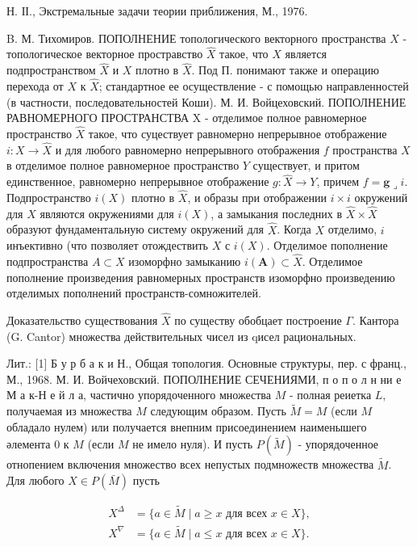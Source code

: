 \documentclass[10pt]{article}
\begin{document}
Н. ІІ., Экстремальные задачи теории приближения, М., 1976.



B. М. Тихомиров. ПОПОЛНЕНИЕ топологического векторного пространства $X$ - топологическое векторное простравство $\hat{X}$ такое, что $X$ является подпространством $\hat{X}$ и $X$ плотно в $\hat{X}$. Под П. понимают также и операцию перехода от $X$ к $\hat{X}$; стандартное ее осуществление - с помощью направленностей (в частности, последовательностей Коши). М. И. Войцеховский. ПОПОЛНЕНИЕ РАВНОМЕРНОГО ПРОСТРАНСТВА $\mathrm{X}$ - отделимое полное равномерное пространство $\hat{X}$ такое, что суцествует равномерно непрерывное отображение $i: X \rightarrow \hat{X}$ и для любого равномерно непрерывного отображения $f$ пространства $X$ в отделимое полное равномерное пространство $Y$ существует, и притом единственное, равномерно непрерывное отображение $g: \hat{X} \rightarrow Y$, причем $f=\mathbf{g}\lrcorner i$. Подпространство $i(X)$ плотно в $\hat{X}$, и образы при отображении $i \times i$ окружений для $X$ являются окружениями для $i(X)$, а замыкания последних в $\hat{X} \times \hat{X}$ образуют фундаментальную систему окружений для $\hat{X}$. Когда $X$ отделимо, $i$ инъективно (что позволяет отождествить $X$ с $i(X)$. Отделимое пополнение подпространства $A \subset X$ изоморфно замыканию $i(\boldsymbol{A}) \subset \hat{X}$. Отделимое пополнение произведения равномерных пространств изоморфно произведению отделимых пополнений пространств-сомножителей.



Доказательство существования $\hat{X}$ по существу обобцает построение $\Gamma$. Кантора (G. Cantor) множества действительных чисел из qисел рациональных.



Лит.: [1] Б у р б а к и Н., Общая топология. Основные структуры, пер. с франц., М., 1968. М. И. Войчеховский. ПОПОЛНЕНИЕ СЕЧЕНИЯМИ, п о п о л н ни е М а к-Н е й л а, частично упорядоченного множества $M$ - полная реиетка $L$, получаемая из множества $M$ следующим образом. Пусть $\tilde{M}=M$ (если $M$ обладало нулем) или получается внепним присоединением наименышего әлемента 0 к $M$ (если $M$ не имело нуля). И пусть $P(\tilde{M})$ - упорядоченное отнопением включения множество всех непустых подмножеств множества $\tilde{M}$. Для любого $X \in P(\bar{M})$ пусть



\[

\begin{aligned}

X^{\Delta} & =\{a \in \tilde{M} \mid a \geqslant x \text { для всех } x \in X\}, \\

X^{\nabla} & =\{a \in \tilde{M} \mid a \leqslant x \text { для всех } x \in X\} .

\end{aligned}

\]
\end{document}
